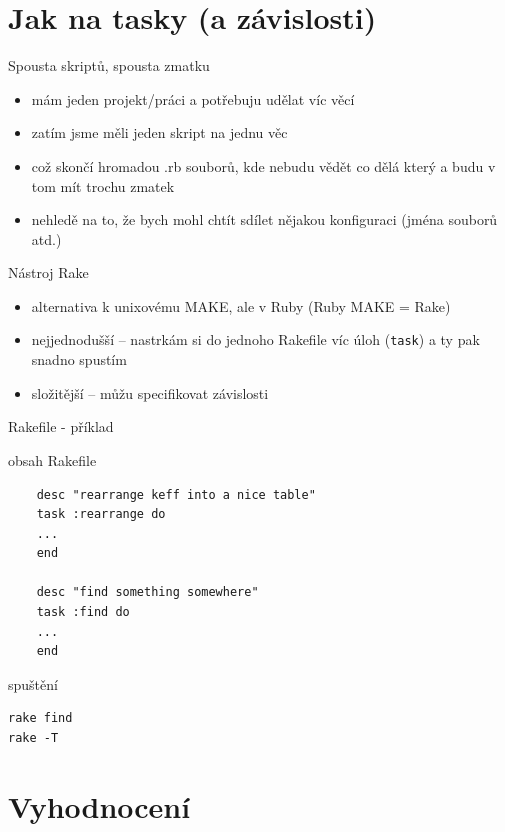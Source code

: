 \documentclass{beamer}
\begin{document}
\section{Jak na tasky (a závislosti)}

\begin{frame}{Spousta skriptů, spousta zmatku}
  \begin{itemize}
    \item mám jeden projekt/práci a potřebuju udělat víc věcí
    \item zatím jsme měli jeden skript na jednu věc
    \item což skončí hromadou .rb souborů, kde nebudu vědět co dělá který a budu v tom mít trochu zmatek
    \item nehledě na to, že bych mohl chtít sdílet nějakou konfiguraci (jména souborů atd.)
  \end{itemize}
\end{frame}

\begin{frame}{Nástroj Rake}
  \begin{itemize}
    \item alternativa k unixovému MAKE, ale v Ruby (Ruby MAKE = Rake)
    \item nejjednodušší -- nastrkám si do jednoho Rakefile víc úloh (\texttt{task}) a ty pak snadno spustím
    \item složitější -- můžu specifikovat závislosti
  \end{itemize}
\end{frame}

\begin{frame}[fragile]{Rakefile - příklad}
  \begin{block}{obsah Rakefile}
        \scriptsize
    \begin{verbatim}
    desc "rearrange keff into a nice table"
    task :rearrange do
    ...
    end

    desc "find something somewhere"
    task :find do
    ...
    end
    \end{verbatim}
  \end{block}
  \begin{block}{spuštění}
        \scriptsize
    \begin{verbatim}
rake find
rake -T
    \end{verbatim}
  \end{block}
\end{frame}

\section{Vyhodnocení}
\end{document}

